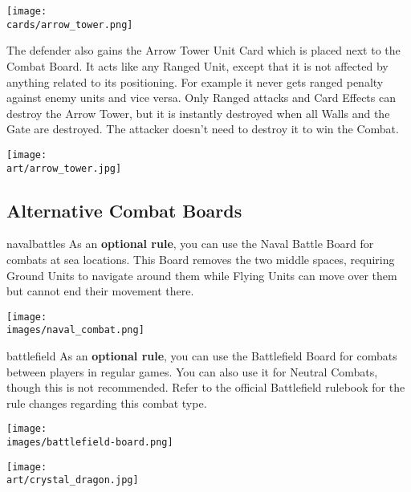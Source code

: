 \begin{multicols*}{2}
\begin{center}
  \texttt{[image: \\cards/arrow\_tower.png]}
\end{center}
The defender also gains the Arrow Tower Unit Card which is placed next to the Combat Board.
It acts like any Ranged  Unit, except that it is not affected by anything related to its positioning.
For example it never gets ranged penalty against enemy units and vice versa.
Only Ranged attacks and Card Effects can destroy the Arrow Tower, but it is instantly destroyed when all Walls and the Gate are destroyed.
The attacker doesn't need to destroy it to win the Combat.

\vspace{1em}

\begin{center}
  \texttt{[image: \\art/arrow\_tower.jpg]}
\end{center}

\newpage

\subsection*{Alternative Combat Boards}
\begin{expansion}{navalbattles}
  As an \textbf{optional rule}, you can use the Naval Battle Board for combats at sea locations.
  This Board removes the two middle spaces, requiring Ground  Units to navigate around them while Flying  Units can move over them but cannot end their movement there.

  \begin{center}
    \texttt{[image: \\images/naval\_combat.png]}
  \end{center}
\end{expansion}

\vspace{2em}
\begin{expansion}{battlefield}
  As an \textbf{optional rule}, you can use the Battlefield Board for combats between players in regular games.
  You can also use it for Neutral Combats, though this is not recommended.
  Refer to the official Battlefield rulebook for the rule changes regarding this combat type.

  \begin{center}
    \texttt{[image: \\images/battlefield-board.png]}
  \end{center}
\end{expansion}
\vfill

\begin{center}
  \texttt{[image: \\art/crystal\_dragon.jpg]}
\end{center}

\end{multicols*}
